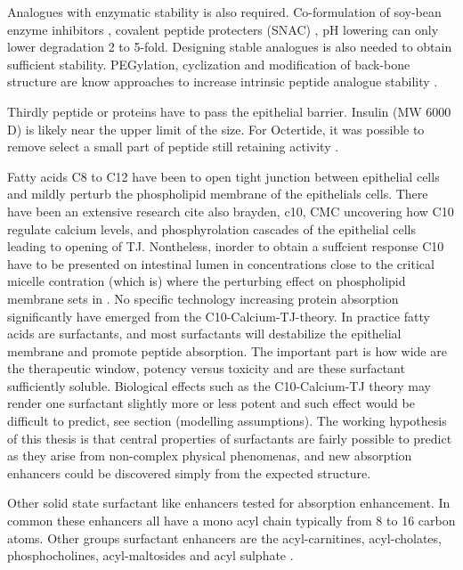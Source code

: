 Analogues with enzymatic stability is also required. Co-formulation of soy-bean enzyme inhibitors \cite{fujii1985promoting}, covalent peptide protecters (SNAC) \cite{bruno2013basics}, pH lowering \cite{welling2014citric} can only lower degradation 2 to 5-fold. Designing stable analogues is also needed to obtain sufficient stability. PEGylation, cyclization and modification of back-bone structure are know approaches to increase intrinsic peptide analogue stability \cite{bruno2013basics}.

Thirdly peptide or proteins have to pass the epithelial barrier. Insulin (MW 6000 D) is likely near the upper limit of the size. For Octertide, it was possible to remove select a small part of peptide still retaining activity \cite{aguiree2013idf}. 

Fatty acids C8 to C12 have been to open tight junction between epithelial cells and mildly perturb the phospholipid membrane of the epithelials cells. There have been an extensive research {cite also brayden, c10, CMC} \cite{bruno2013basics} uncovering how C10 regulate calcium levels, and phosphyrolation cascades of the epithelial cells leading to opening of TJ. Nontheless, inorder to obtain a suffcient response C10 have to be presented on intestinal lumen in concentrations close to the critical micelle contration (which is) where the perturbing effect on phospholipid membrane sets in \cite{bruno2013basics}. No specific technology increasing protein absorption significantly have emerged from the C10-Calcium-TJ-theory. In practice fatty acids are surfactants, and most surfactants will destabilize the epithelial membrane and promote peptide absorption. The important part is how wide are the therapeutic window, potency versus toxicity and are these surfactant sufficiently soluble. Biological effects such as the C10-Calcium-TJ theory may render one surfactant slightly more or less potent and such effect would be difficult to predict, see section (modelling assumptions). The working hypothesis of this thesis is that central properties of surfactants are fairly possible to predict as they arise from non-complex physical phenomenas, and new absorption enhancers could be discovered simply from the expected structure.

Other solid state surfactant like enhancers tested for absorption enhancement. In common these enhancers all have a mono acyl chain typically from 8 to 16 carbon atoms. Other groups surfactant enhancers are the acyl-carnitines, acyl-cholates\cite{lee2000oral}, phosphocholines\cite{liu1999dodecylphosphocholine}, acyl-maltosides \cite{petersen2013colonic} and acyl sulphate \cite{anderberg1993epithelial}.

